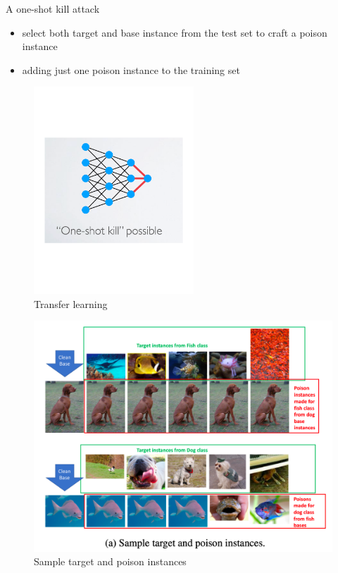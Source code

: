 \documentclass[11pt]{article}
\numberwithin{equation}{section}
\begin{document}
\colorbox{orange!15}{A one-shot kill attack}

\begin{itemize}
    \item select both target and base instance from the test set to craft a poison instance
    \item adding just one poison instance to the training set
\end{itemize}

\begin{figure}[!h]
	\centering
	\includegraphics[width=6cm]{figures/transfer.pdf}
	\caption{Transfer learning}
	\label{fig:transfer}
\end{figure}


\begin{figure}[!h]
	\centering
	\includegraphics[width=15cm]{figures/P_instances.pdf}
	\caption{Sample target and poison instances}
	\label{fig:P_instances}
\end{figure}
\end{document}
